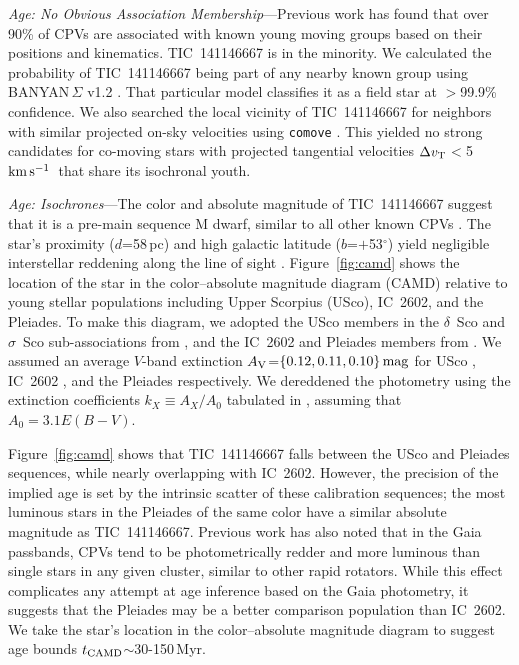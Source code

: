 \documentclass{nature3}
\newcommand{\kms}{\ensuremath{\rm km\,s^{-1}}}
\begin{document}
\begin{methods}
{\it Age: No Obvious Association Membership}---Previous work
\cite{Bouma2024} has found that over 90\% of CPVs are associated with
known young moving groups based on their positions and kinematics.
TIC~141146667 is in the minority.  We calculated the probability of
TIC~141146667 being part of any nearby known group using
BANYAN\,$\Sigma$ v1.2 \cite{Gagne2018}.  That particular model
classifies it as a field star at $>$99.9\% confidence.  We also
searched the local vicinity of TIC~141146667 for neighbors with
similar projected on-sky velocities using \texttt{comove}
\cite{Tofflemire2021}.  This yielded no strong candidates for
co-moving stars with projected tangential velocities $\Delta v_{\rm
T}$$<$5\,\kms\ that share its isochronal youth.

{\it Age: Isochrones}---The color and absolute magnitude of
TIC~141146667 suggest that it is a pre-main sequence M dwarf, similar to
all other known CPVs \cite{Stauffer2017,Stauffer2021,Bouma2024}.  The
star's proximity ($d$=58\,pc) and high galactic latitude
($b$=$+$53$^\circ$) yield negligible interstellar reddening along the
line of sight \cite{Green2019}.  Figure~\ref{fig:camd} shows the
location of the star in the color--absolute magnitude diagram (CAMD)
relative to young stellar populations including Upper Scorpius (USco),
IC~2602, and the Pleiades.  To make this diagram, we adopted the USco
members in the $\delta$~Sco and $\sigma$~Sco sub-associations from
\cite{Ratzenbock2023}, and the IC~2602 and Pleiades members from
\cite{Hunt2024}.  We assumed an average $V$-band extinction $A_{\rm
V}$=$\{0.12, 0.11, 0.10\}\,{\rm mag}$ for USco \cite{Pecaut2016},
IC~2602 \cite{Hunt2024}, and the Pleiades \cite{Hunt2024} respectively.
We dereddened the photometry using the extinction coefficients
$k_X\equiv A_X/A_0$ tabulated in \cite{GaiaCollaboration2018}, assuming
that $A_0 = 3.1 E(B-V)$.

Figure~\ref{fig:camd} shows that TIC~141146667 falls between the USco
and Pleiades sequences, while nearly overlapping with IC~2602.  However,
the precision of the implied age is set by the intrinsic scatter of
these calibration sequences; the most luminous stars in the Pleiades of
the same color have a similar absolute magnitude as TIC~141146667.
Previous work \cite{Stauffer2021} has also noted that in the Gaia
passbands, CPVs tend to be photometrically redder and more luminous than
single stars in any given cluster, similar to other rapid rotators.
While this effect complicates any attempt at age inference based on the
Gaia photometry, it suggests that the Pleiades may be a better
comparison population than IC~2602.  We take the star's
location in the color--absolute magnitude diagram to suggest age bounds
$t_{\rm CAMD}$$\sim$30-150\,Myr.



\end{methods}
\end{document}
